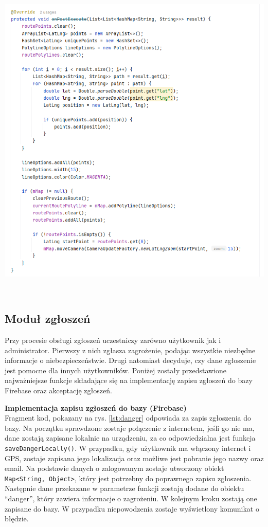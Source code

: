 \noindent
\begin{minipage}{\linewidth}
    \label{lst:rystras}
    \centering
    \includegraphics[width=0.6\linewidth]{img/kod/rys-tras.png}
\end{minipage}
\\

\subsection{Moduł zgłoszeń}
Przy procesie obsługi zgłoszeń uczestniczy zarówno użytkownik jak i administrator. Pierwszy z nich zgłasza zagrożenie, podając wszystkie niezbędne informacje o niebezpieczeństwie. Drugi natomiast decyduje, czy dane zgłoszenie jest pomocne dla innych użytkowników.  Poniżej zostały przedstawione najważniejsze funkcje składające się na implementację zapisu zgłoszeń do bazy Firebase oraz akceptację zgłoszeń.

\textbf{Implementacja zapisu zgłoszeń do bazy (Firebase)} \\ 
Fragment kod, pokazany na rys. \ref{lst:danger} odpowiada za zapis zgłoszenia do bazy. Na początku sprawdzone zostaje połączenie z internetem, jeśli go nie ma, dane zostają zapisane lokalnie na urządzeniu, za co odpowiedzialna jest funkcja \verb|saveDangerLocally()|. W przypadku, gdy użytkownik ma włączony internet i GPS, zostaje zapisana jego lokalizacja oraz możliwe jest pobranie jego nazwy oraz email. Na podstawie danych o zalogowanym zostaje utworzony obiekt  \verb|Map<String, Object>|, który jest potrzebny do poprawnego zapisu zgłoszenia. Następnie dane przekazane w parametrze funkcji zostają dodane do obiektu “danger”, który zawiera informacje o zagrożeniu. W kolejnym kroku zostają one zapisane do bazy. W przypadku niepowodzenia zostaje wyświetlony komunikat o błędzie. \\

